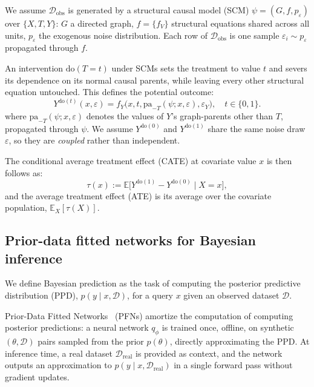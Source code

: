 \documentclass[11pt]{article}
\newtheorem{assumption}{Assumption}
\newcommand{\EE}{\mathbb{E}}
\begin{document}
We assume $\mathcal{D}_{\text{obs}}$ is generated by a structural causal model \citep{pearl2009, peters} (SCM) $\psi = (G, f, p_\varepsilon)$ over $\{X, T, Y\}$: $G$ a directed graph, $f = \{f_V\}$ structural equations shared across all units, $p_\varepsilon$ the exogenous noise distribution. Each row of $\mathcal{D}_{\text{obs}}$ is one sample $\varepsilon_i \sim p_\varepsilon$ propagated through $f$. 

An intervention $\text{do}(T=t)$ under SCMs sets the treatment to value $t$ and severs its dependence on its normal causal parents, while leaving every other structural equation untouched. This defines the potential outcome:
$$Y^{\text{do}(t)}(x,\varepsilon) = f_Y\big(x, t, \mathrm{pa}_{-T}(\psi;x,\varepsilon), \varepsilon_Y\big), \quad t\in\{0,1\}.$$
where $\mathrm{pa}_{-T}(\psi; x, \varepsilon)$ denotes the values of $Y$'s graph-parents other than $T$, propagated through $\psi$. We assume $Y^{\text{do}(0)}$ and $Y^{\text{do}(1)}$ share the same noise draw $\varepsilon$, so they are \textit{coupled} rather than independent. 



The conditional average treatment effect (CATE) at covariate value $x$ is then follows as:
$$\tau(x) := \mathbb{E}\big[Y^{\text{do}(1)} - Y^{\text{do}(0)} \mid X = x\big],$$
and the average treatment effect (ATE) is its average over the covariate population, $\mathbb{E}_X[\tau(X)]$.

\subsection{Prior-data fitted networks for Bayesian inference}
\label{sec:pfn}
We define Bayesian prediction as the task of computing the posterior predictive distribution (PPD), $p(y \mid x, \mathcal{D})$, for a query $x$ given an observed dataset $\mathcal{D}$.

Prior-Data Fitted Networks~\citep{muller2022pfn} (PFNs) amortize the computation of computing posterior predictions: a neural network $q_\phi$ is trained once, offline, on synthetic $(\theta, \mathcal{D})$ pairs sampled from the prior $p(\theta)$, directly approximating the PPD. At inference time, a real dataset $\mathcal{D}_{\text{real}}$ is provided as context, and the network outputs an approximation to $p(y \mid x, \mathcal{D}_{\text{real}})$ in a single forward pass without gradient updates.
\end{document}
